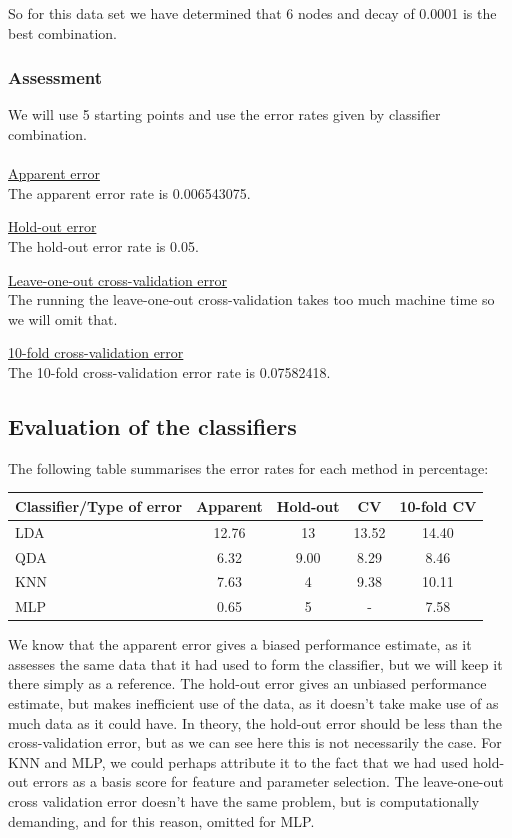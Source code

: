\documentclass[11pt, a4paper]{article}
\begin{document}
So for this data set we have determined that 6 nodes and decay of 0.0001 is the best combination.

\subsubsection{Assessment}

We will use 5 starting points and use the error rates given by classifier combination.
\\
\\
\underline{Apparent error}
\\
The apparent error rate is 0.006543075.

\underline{Hold-out error}
\\
The hold-out error rate is 0.05.

\underline{Leave-one-out cross-validation error}
\\
The running the leave-one-out cross-validation takes too much machine time so we will omit that.

\underline{10-fold cross-validation error}
\\
The 10-fold cross-validation error rate is 0.07582418.

\subsection{Evaluation of the classifiers}

The following table summarises the error rates for each method in percentage:

\begin{tabular}{| l | c | c | c | c |}
\hline
  Classifier/Type of error & Apparent & Hold-out & CV & 10-fold CV \\\hline
  LDA & 12.76 & 13 & 13.52 & 14.40 \\\hline
  QDA & 6.32 & 9.00 & 8.29 & 8.46 \\\hline
  KNN & 7.63 & 4 & 9.38 & 10.11 \\\hline
  MLP & 0.65 & 5 & - & 7.58 \\
  \hline
\end{tabular}

We know that the apparent error gives a biased performance estimate, as it assesses the same data that it had used to form the classifier, but we will keep it there simply as a reference. The hold-out error gives an unbiased performance estimate, but makes inefficient use of the data, as it doesn't take make use of as much data as it could have. In theory, the hold-out error should be less than the cross-validation error, but as we can see here this is not necessarily the case. For KNN and MLP, we could perhaps attribute it to the fact that we had used hold-out errors as a basis score for feature and parameter selection. The leave-one-out cross validation error doesn't have the same problem, but is computationally demanding, and for this reason, omitted for MLP. 
\end{document}
